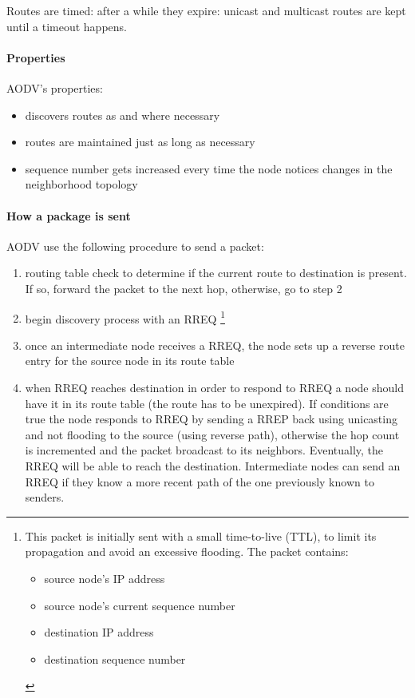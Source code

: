 Routes are timed: after a while they expire: unicast and multicast routes are
kept until a timeout happens.

\paragraph*{Properties} AODV's properties:
\begin{itemize}
\item discovers routes as and where necessary
\item routes are maintained just as long as necessary
\item sequence number gets increased every time the node notices changes in the
neighborhood topology
\end{itemize}

\paragraph*{How a package is sent} AODV use the following procedure to send a
packet:
\begin{enumerate}
\item routing table check to determine if the current route to destination is
  present. If so, forward the packet to the next hop, otherwise, go to step 2
\item begin discovery process with an RREQ \footnote{
  This packet is initially sent with a small time-to-live (TTL), to limit its
  propagation and avoid an excessive flooding.
  The packet contains:
  \begin{itemize}
  \item source node's IP address
  \item source node's current sequence number
  \item destination IP address
  \item destination sequence number
  \end{itemize}
}
\item once an intermediate node receives a RREQ, the node sets up a reverse
  route entry for the source node in its route table
\item when RREQ reaches destination in order to respond to RREQ a node should
  have it in its route table (the route has to be unexpired). If conditions are
  true the node responds to RREQ by sending a RREP back using unicasting
  and not flooding to the source (using reverse path), otherwise the hop count
  is incremented and the packet broadcast to its neighbors. Eventually, the
  RREQ will be able to reach the destination. Intermediate nodes can send an
  RREQ if they know a more recent path of the one previously known to senders.
\end{enumerate}


